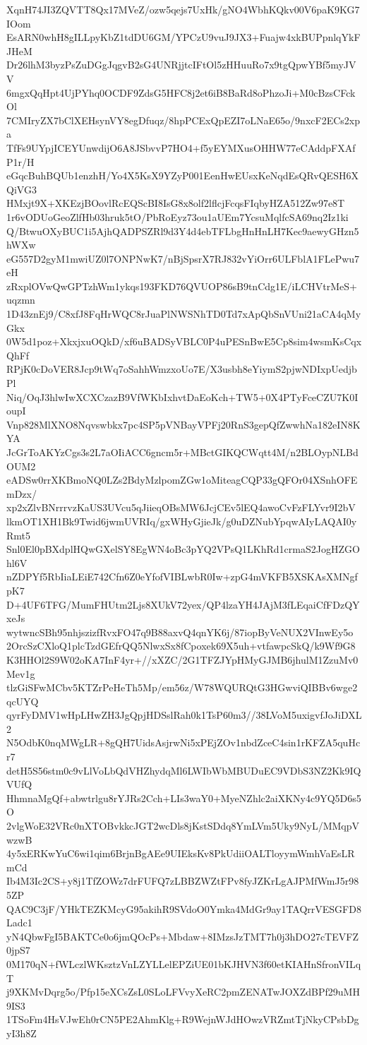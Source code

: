 XqnH74JI3ZQVTT8Qx17MVeZ/ozw5qejs7UxHk/gNO4WbhKQkv00V6paK9KG7IOom
EsARN0whH8gILLpyKbZ1tdDU6GM/YPCzU9vuJ9JX3+Fuajw4xkBUPpnlqYkFJHeM
Dr26lhM3byzPsZuDGgJqgvB2sG4UNRjjtcIFtOl5zHHuuRo7x9tgQpwYBf5myJVV
6mgxQqHpt4UjPYhq0OCDF9ZdsG5HFC8j2et6iB8BaRd8oPhzoJi+M0cBzsCFckOl
7CMIryZX7bClXEHsynVY8egDfuqz/8hpPCExQpEZI7oLNaE65o/9nxcF2ECs2xpa
TfFs9UYpjICEYUnwdijO6A8JSbvvP7HO4+f5yEYMXusOHHW77eCAddpFXAfP1r/H
eGqcBuhBQUb1enzhH/Yo4X5KsX9YZyP001EenHwEUsxKeNqdEsQRvQESH6XQiVG3
HMxjt9X+XKEzjBOovlRcEQScBI8IsG8x8olf2lflcjFcqsFIqbyHZA512Zw97e8T
1r6vODUoGeoZlfHb03hruk5tO/PbRoEyz73ou1aUEm7YcsuMqlfcSA69nq2Iz1ki
Q/BtwuOXyBUC1i5AjhQADPSZRl9d3Y4d4ebTFLbgHnHnLH7Kec9aewyGHzn5hWXw
eG557D2gyM1mwiUZ0l7ONPNwK7/nBjSpsrX7RJ832vYiOrr6ULFblA1FLePwu7eH
zRxplOVwQwGPTzhWm1ykqs193FKD76QVUOP86sB9tnCdg1E/iLCHVtrMeS+uqzmn
1D43znEj9/C8xfJ8FqHrWQC8rJuaPlNWSNhTD0Td7xApQbSnVUni21aCA4qMyGkx
0W5d1poz+XkxjxuOQkD/xf6uBADSyVBLC0P4uPESnBwE5Cp8sim4wsmKsCqxQhFf
RPjK0cDoVER8Jcp9tWq7oSahhWmzxoUo7E/X3usbh8eYiymS2pjwNDIxpUedjbPl
Niq/OqJ3hlwIwXCXCzazB9VfWKbIxhvtDaEoKch+TW5+0X4PTyFceCZU7K0IoupI
Vnp828MlXNO8Nqvswbkx7pc4SP5pVNBayVPFj20RnS3gepQfZwwhNa182eIN8KYA
JcGrToAKYzCgs3s2L7aOIiACC6gncm5r+MBctGIKQCWqtt4M/n2BLOypNLBdOUM2
eADSw0rrXKBmoNQ0LZs2BdyMzlpomZGw1oMiteagCQP33gQFOr04XSnhOFEmDzx/
xp2xZlvBNrrrvzKaUS3UVcu5qJiieqOBsMW6JcjCEv5lEQ4awoCvFzFLYvr9I2bV
lkmOT1XH1Bk9Twid6jwmUVRIq/gxWHyGjieJk/g0uDZNubYpqwAIyLAQAI0yRmt5
Snl0El0pBXdplHQwGXelSY8EgWN4oBc3pYQ2VPsQ1LKhRd1crmaS2JogHZGOhl6V
nZDPYf5RbIiaLEiE742Cfn6Z0eYfofVIBLwbR0Iw+zpG4mVKFB5XSKAsXMNgfpK7
D+4UF6TFG/MumFHUtm2Ljs8XUkV72yex/QP4lzaYH4JAjM3fLEqaiCfFDzQYxeJs
wytwncSBh95nhjszizfRvxFO47q9B88axvQ4qnYK6j/87iopByVeNUX2VInwEy5o
2OrcSzCXloQ1plcTzdGEfrQQ5NlwxSx8fCpoxek69X5uh+vtfawpcSkQ/k9Wf9G8
K3HHOl2S9W02oKA7InF4yr+//xXZC/2G1TFZJYpHMyGJMB6jhulM1ZzuMv0Mev1g
tlzGiSFwMCbv5KTZrPeHeTh5Mp/em56z/W78WQURQtG3HGwviQIBBv6wge2qcUYQ
qyrFyDMV1wHpLHwZH3JgQpjHDSslRah0k1TsP60m3//38LVoM5uxigvfJoJiDXL2
N5OdbK0nqMWgLR+8gQH7UidsAsjrwNi5xPEjZOv1nbdZceC4sin1rKFZA5quHcr7
detH5S56stm0c9vLlVoLbQdVHZhydqMl6LWIbWbMBUDuEC9VDbS3NZ2Kk9IQVUfQ
HhmnaMgQf+abwtrlgu8rYJRs2Cch+LIs3waY0+MyeNZhlc2aiXKNy4c9YQ5D6s5O
2vlgWoE32VRc0nXTOBvkkcJGT2wcDls8jKstSDdq8YmLVm5Uky9NyL/MMqpVwzwB
4y5xERKwYuC6wi1qim6BrjnBgAEe9UIEksKv8PkUdiiOALTloyymWmhVaEsLRmCd
Ib4M3Ic2CS+y8j1TfZOWz7drFUFQ7zLBBZWZtFPv8fyJZKrLgAJPMfWmJ5r985ZP
QAC9C3jF/YHkTEZKMcyG95akihR9SVdoO0Ymka4MdGr9ay1TAQrrVESGFD8Ladc1
yN4QbwFgI5BAKTCe0o6jmQOcPs+Mbdaw+8IMzsJzTMT7h0j3hDO27cTEVFZ0jpS7
0M170qN+fWLczlWKsztzVnLZYLLelEPZiUE01bKJHVN3f60etKIAHnSfronVILqT
j9XKMvDqrg5o/Pfp15eXCsZsL0SLoLFVvyXeRC2pmZENATwJOXZdBPf29uMH9IS3
1TSoFm4HsVJwEh0rCN5PE2AhmKlg+R9WejnWJdHOwzVRZmtTjNkyCPsbDgyI3h8Z
